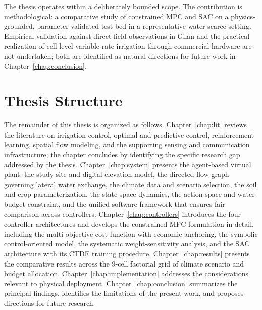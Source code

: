 The thesis operates within a deliberately bounded scope. The
contribution is methodological: a comparative study of constrained
MPC and SAC on a physics-grounded, parameter-validated test bed in
a representative water-scarce setting. Empirical validation against
direct field observations in Gilan and the practical realization of
cell-level variable-rate irrigation through commercial hardware are
not undertaken; both are identified as natural directions for
future work in Chapter~\ref{chap:conclusion}.

\section{Thesis Structure}
\label{sec:intro-structure}

The remainder of this thesis is organized as follows.
Chapter~\ref{chap:lit} reviews the literature on irrigation control,
optimal and predictive control, reinforcement learning, spatial flow
modeling, and the supporting sensing and communication infrastructure;
the chapter concludes by identifying the specific research gap
addressed by the thesis. Chapter~\ref{chap:system} presents the
agent-based virtual plant: the study site and digital elevation model,
the directed flow graph governing lateral water exchange, the climate
data and scenario selection, the soil and crop parameterization, the
state-space dynamics, the action space and water-budget constraint,
and the unified software framework that ensures fair comparison
across controllers. Chapter~\ref{chap:controllers} introduces the four
controller architectures and develops the constrained MPC formulation
in detail, including the multi-objective cost function with economic
anchoring, the symbolic control-oriented model, the systematic
weight-sensitivity analysis, and the SAC architecture with its CTDE
training procedure. Chapter~\ref{chap:results} presents the
comparative results across the 9-cell factorial grid of climate
scenario and budget allocation. Chapter~\ref{chap:implementation}
addresses the considerations relevant to physical deployment.
Chapter~\ref{chap:conclusion} summarizes the principal findings,
identifies the limitations of the present work, and proposes
directions for future research.
